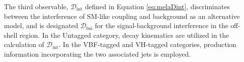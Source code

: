 The third observable, $\mathcal{D}_\text{int}$ defined in Equation \ref{eq:melaDint}, discriminates between the interference
of SM-like \Hboson coupling and background as an alternative model, and is designated
$\mathcal{D}_\text{bsi}$ for the signal-background interference in the off-shell region.
In the Untagged category, decay kinematics are utilized in the calculation of $\mathcal{D}_\text{int}$.
In the VBF-tagged and VH-tagged categories, production information incorporating the two associated jets is employed.



